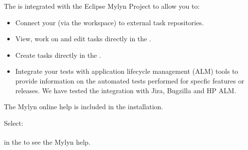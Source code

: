 The \ite{} is integrated with the Eclipse Mylyn Project to allow you to:
\begin{itemize}
\item Connect your \ite{} (via the workspace) to external task repositories.
\item View, work on and edit tasks directly in the \ite{}.
\item Create tasks directly in the \ite{}.
\item Integrate your tests with application lifecycle management (ALM) tools to provide information on the automated tests performed for specfic features or releases. We have tested the integration with Jira, Bugzilla and HP ALM. 
\end{itemize}

The Mylyn online help is included in the installation. 

Select:\\
 \\
in the \ite{} to see the Mylyn help. 
